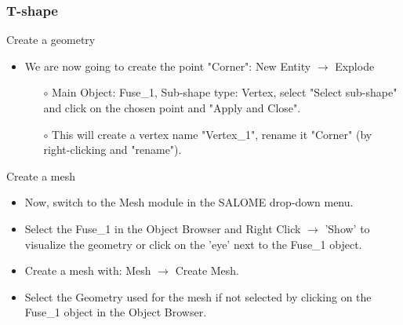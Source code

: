 \documentclass[10pt, hyperref={unicode=true,pdfusetitle, bookmarks=true,bookmarksnumbered=false,bookmarksopen=false, breaklinks=false,pdfborder={0 0 1},backref=true,colorlinks=true,linkcolor=darkblue,pageanchor}]{beamer}
\begin{document}
\begin{frame}
\frametitle{T-shape}

\begin{block}{Create a geometry}
\begin{itemize}
\item We are now going to create the point "Corner": New Entity $\rightarrow$ Explode \\
    \begin{itemize}
    \item [$\circ$] Main Object: Fuse\_1, Sub-shape type: Vertex, select "Select sub-shape" and click on the chosen point and "Apply and Close".
    \item [$\circ$] This will create a vertex name "Vertex\_1", rename it "Corner" (by right-clicking and "rename").
    \end{itemize}
\end{itemize}
\end{block}

\begin{block}{Create a mesh}
\begin{itemize}
\item \label{salome_mesh} Now, switch to the Mesh module in the SALOME drop-down menu.
\item Select the Fuse\_1 in the Object Browser and Right Click $\rightarrow$ 'Show' to visualize the geometry or click on the 'eye' next to the Fuse\_1 object.
\item Create a mesh with: Mesh $\rightarrow$ Create Mesh.
\item Select the Geometry used for the mesh if not selected by clicking on the Fuse\_1 object in the Object Browser.
\end{itemize}
\end{block}

\end{frame}
\end{document}
